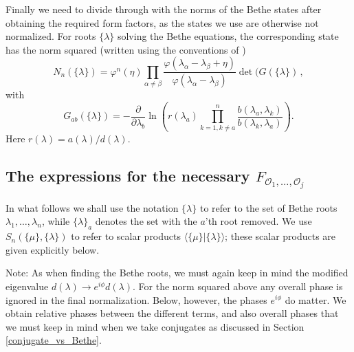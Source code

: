 \documentclass[a4paper,10pt]{article}
\newcommand{\linnea}[1]{$\framebox{\tiny L}$\ \textbf{\texttt{{\color{red}\footnotesize#1}}}}
\begin{document}
Finally we need to divide through with the norms of the Bethe states after obtaining the required form factors, as the states we use are otherwise not normalized. For roots $\{\lambda\}$ solving the Bethe equations, the corresponding state has the norm squared (written using the conventions of \cite{Terras})
\begin{equation}
N_n(\{\lambda\})= \varphi^n(\eta)\prod_{\alpha\neq\beta}\frac{\varphi(\lambda_\alpha-\lambda_\beta+\eta)}{\varphi(\lambda_\alpha-\lambda_\beta)} \det(G(\{\lambda\}) \,,
\end{equation}
with
\begin{equation}
G_{ab}(\{\lambda\})= -\frac{\partial}{\partial\lambda_b} \ln \left(r(\lambda_a) \prod_{k=1,k\neq a}^n  \frac{b(\lambda_a,\lambda_k)}{b(\lambda_k,\lambda_a)}\right).
\end{equation}
Here $r(\lambda)=a(\lambda)/d(\lambda)$.




\subsection{The expressions for the necessary $F_{\mathcal{O}_1,\ldots,\mathcal{O}_j}$ }
In what follows we shall use the notation $\{\lambda\}$ to refer to the set of Bethe roots $\lambda_1,\ldots,\lambda_n$, while $\{\lambda\}_a$ denotes the set with the $a$'th root removed. We use $S_n(\{\mu\},\{\lambda\})$ to refer to scalar products $\langle \{\mu\}| \{\lambda\}\rangle$; these scalar products are given explicitly below.

Note: As when finding the Bethe roots, we must again keep in mind the modified eigenvalue $d(\lambda)\rightarrow e^{i\phi} d(\lambda)$. For the norm squared above any overall phase is ignored in the final normalization. Below, however, the phases $ e^{i\phi}$ do matter. We obtain relative phases between the different terms, and also overall phases that we must keep in mind when we take conjugates as discussed in Section \ref{conjugate_vs_Bethe}.
\end{document}
